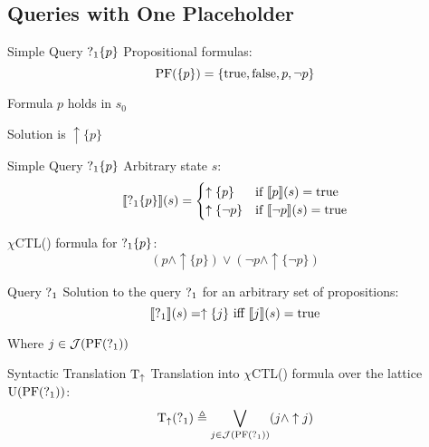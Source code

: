 \subsection[One Placeholder]{Queries with One Placeholder}

%  
%  


\begin{frame}{Simple Query $\operatorname{?}_1\{p\}$}
  Propositional formulas:
  \[ \operatorname{PF}(\{p\}) = \{ \operatorname{true}, \operatorname{false}, p, \lnot p\} \]
  
  Formula $p$ holds in $s_0$
  
  Solution is $\uparrow\{p\}$
  
  
\end{frame}

\begin{frame}{Simple Query $\operatorname{?}_1\{p\}$}
  Arbitrary state $s$:
  \[ \llbracket \operatorname{?}_1\{p\} \rrbracket (s) = \begin{cases}
       \uparrow\{p\} & \text{if } \llbracket p \rrbracket (s) = \operatorname{true} \\
       \uparrow\{\lnot p\} & \text{if } \llbracket \lnot p \rrbracket (s) = \operatorname{true} \\
     \end{cases} 
  \]
  
  $\chi$CTL(\mcL) formula for $\operatorname{?}_1\{p\}$:
  \[ (p \land \uparrow\{p\}) \lor (\lnot p \land \uparrow\{\lnot p\}) \]
\end{frame}

\begin{frame}{Query $\operatorname{?}_1$}
  Solution to the query $\operatorname{?}_1$ for an arbitrary set of propositions:
  \[ \llbracket \operatorname{?}_1 \rrbracket (s) = \uparrow\{j\} \text{ iff } \llbracket j \rrbracket (s) = \operatorname{true}
  \]
  
  Where $j\in\mathcal{J}(\operatorname{PF}(\operatorname{?}_1))$
\end{frame}

\begin{frame}{Syntactic Translation $\operatorname{T}_\uparrow$}
  Translation into $\chi$CTL(\mcL) formula over the lattice $\operatorname{U}(\operatorname{PF}(\operatorname{?}_1))$:
  \[ 
    \operatorname{T}_\uparrow(\operatorname{?}_1) \triangleq \bigvee_{j\in\mathcal{J}(\operatorname{PF}(\operatorname{?}_1))} (j \land \uparrow j)
  \]
\end{frame}

